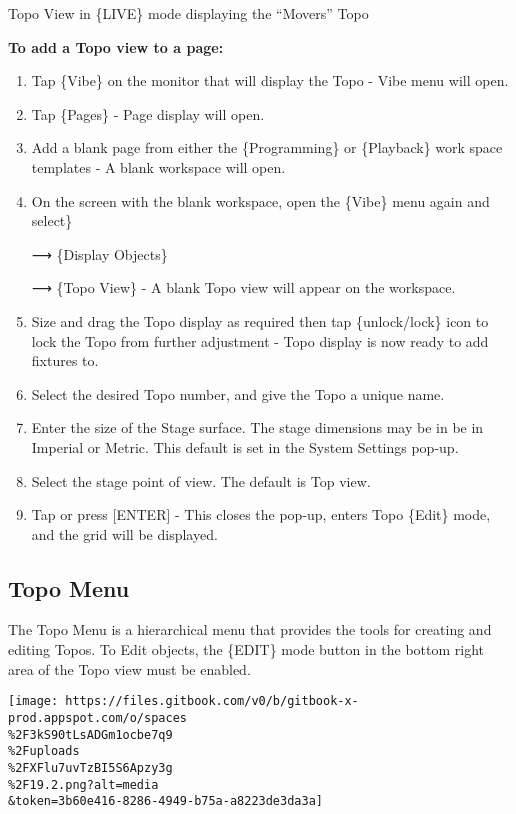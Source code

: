 \documentclass[
]{article}
\begin{document}
Topo View in \{LIVE\} mode displaying the ``Movers'' Topo

\textbf{To add a Topo view to a page:}

\begin{enumerate}
\def\labelenumi{\arabic{enumi}.}
\item
  Tap \{Vibe\} on the monitor that will display the Topo - Vibe menu will open.
\item
  Tap \{Pages\} - Page display will open.
\item
  Add a blank page from either the \{Programming\} or \{Playback\} work space templates - A blank workspace will open.
\item
  On the screen with the blank workspace, open the \{Vibe\} menu again and select\}

  ⟶ \{Display Objects\}

  ⟶ \{Topo View\} - A blank Topo view will appear on the workspace.
\item
  Size and drag the Topo display as required then tap \{unlock/lock\} icon to lock the Topo from further adjustment - Topo display is now ready to add fixtures to.
\item
  Select the desired Topo number, and give the Topo a unique name.
\item
  Enter the size of the Stage surface. The stage dimensions may be in be in Imperial or Metric. This default is set in the System Settings pop-up.
\item
  Select the stage point of view. The default is Top view.
\item
  Tap \href{image.png}{} or press {[}ENTER{]} - This closes the pop-up, enters Topo \{Edit\} mode, and the grid will be displayed.
\end{enumerate}

\hypertarget{topo-menu}{%
\subsection{Topo Menu}\label{topo-menu}}

The Topo Menu is a hierarchical menu that provides the tools for creating and editing Topos. To Edit objects, the \{EDIT\} mode button in the bottom right area of the Topo view must be enabled.

\texttt{[image: https://files.gitbook.com/v0/b/gitbook-x-prod.appspot.com/o/spaces\\\%2F3kS90tLsADGm1ocbe7q9\\\%2Fuploads\\\%2FXFlu7uvTzBI5S6Apzy3g\\\%2F19.2.png?alt=media\\\&token=3b60e416-8286-4949-b75a-a8223de3da3a]}
\end{document}

